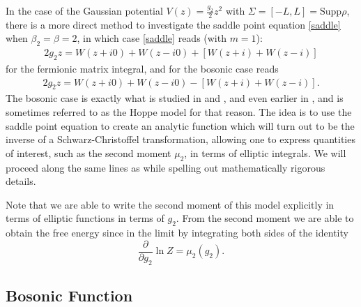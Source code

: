 \documentclass[10pt]{article}
\theoremstyle{plain}
\theoremstyle{definition}
\theoremstyle{plain}
\begin{document}
In the case of the Gaussian potential $V(z)=\frac{g_2}{2}z^2$ with $\Sigma = [-L,L] =  \text{Supp} \rho$, there is a more direct method to investigate the saddle point equation \eqref{saddle} when $\beta_2 = \beta=2$, in which case \ref{saddle} reads (with $m=1$):
\begin{align}
	2g_2 z = W(z+i0) + W(z-i0) + [W(z+i) + W(z-i)] \label{fermionic saddle}
\end{align}
for the fermionic matrix integral, and for the bosonic case reads
\begin{align}
	2g_2z = W(z+i0) + W(z-i0) - [W(z+i) + W(z-i)]. \label{bosonic saddle} 
\end{align}
The bosonic case is exactly what is studied in \cite{kostov2002exact} and \cite{kazakov1999d}, and even earlier in \cite{hoppe1989quantum}, and is sometimes referred to as the Hoppe model for that reason. The idea is to use the saddle point equation to create an analytic function which will turn out to be the inverse of a Schwarz-Christoffel transformation, allowing one to express quantities of interest, such as the second moment $\mu_2$, in terms of elliptic integrals. We will proceed along the same lines as \cite{kazakov1999d} while spelling out mathematically rigorous details. 

Note that we are able to write the second moment of this model explicitly in terms of elliptic functions in terms of $g_2$. From the second moment we are able to obtain the free energy since in the limit by integrating both sides of the identity
\begin{equation*}
    \frac{\partial}{\partial g_{2}}\ln Z = \mu_{2}(g_{2}).
\end{equation*}
\subsection{Bosonic Function}
\end{document}
